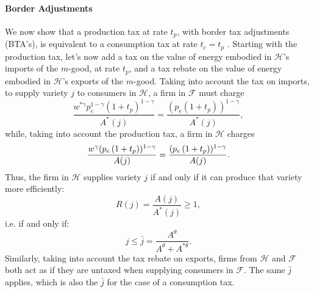 \documentclass[notitlepage,12pt]{article}
\begin{document}
\paragraph{Border Adjustments}

We now show that a production tax at rate $t_{p}$, with border tax
adjustments (BTA's), is equivalent to a consumption tax at rate $t_{c}=t_{p}$%
. Starting with the production tax, let's now add a tax on the value of
energy embodied in $\mathcal{H}$'s imports of the $m$-good, at rate $t_{p}$,
and a tax rebate on the value of energy embodied in $\mathcal{H}$'s exports
of the $m$-good. Taking into account the tax on imports, to supply variety $%
j $ to consumers in $\mathcal{H}$, a firm in $\mathcal{F}$ must charge%
\begin{equation*}
\frac{w^{\ast \gamma }p_{e}^{1-\gamma }(1+t_{p})^{1-\gamma }}{A^{\ast }(j)}=%
\frac{(p_{e}\left( 1+t_{p}\right) )^{1-\gamma }}{A^{\ast }(j)},
\end{equation*}%
while, taking into account the production tax, a firm in $\mathcal{H}$
charges 
\begin{equation*}
\frac{w^{\gamma }(p_{e}\left( 1+t_{p}\right) )^{1-\gamma }}{A(j)}=\frac{%
(p_{e}\left( 1+t_{p}\right) )^{1-\gamma }}{A(j)}.
\end{equation*}%
Thus, the firm in $\mathcal{H}$ supplies variety $j$ if and only if it can
produce that variety more efficiently: 
\begin{equation*}
R(j)=\frac{A(j)}{A^{\ast }(j)}\geq 1,
\end{equation*}%
i.e. if and only if:%
\begin{equation*}
j\leq \bar{j}=\frac{A^{\theta }}{A^{\theta }+A^{\ast \theta }}.
\end{equation*}%
Similarly, taking into account the tax rebate on exports, firms from $%
\mathcal{H}$ and $\mathcal{F}$ both act as if they are untaxed when
supplying consumers in $\mathcal{F}$. The same $\bar{j}$ applies, which is
also the $\bar{j}$ for the case of a consumption tax.
\end{document}
